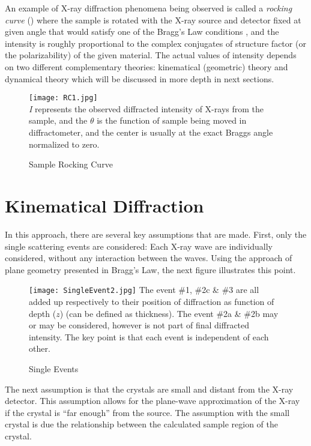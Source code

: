 An example of X-ray diffraction phenomena being observed is called a \emph{rocking curve} () where the sample is rotated with the X-ray source and detector fixed at given angle that would satisfy one of the Bragg's Law conditions , and the intensity is roughly proportional to the complex conjugates of structure factor (or the polarizability) of the given material.  The actual values of intensity depends on two different complementary theories:  kinematical (geometric) theory and dynamical theory which will be discussed in more depth in next sections.  

\begin{figure}[h]
\centering
\caption{Sample Rocking Curve}
\label{RC1}
\texttt{[image: RC1.jpg]}\\
\emph{I} represents the observed diffracted intensity of X-rays from the sample, and the $\theta$ is the function of sample being moved in diffractometer, and the center is usually at the exact Braggs angle normalized to zero.
\end{figure}




	\section{Kinematical Diffraction}

In this approach, there are several key assumptions that are made.  First, only the single scattering events are considered:  Each X-ray wave are individually considered, without any interaction between the waves.   Using the approach of plane geometry presented in Bragg's Law, the next figure  illustrates this point.  

\begin{figure}[h]
\caption{Single Events}
\label{SingleEvent}
\texttt{[image: SingleEvent2.jpg]}
The event \#1, \#2c \& \#3 are all added up respectively to their position of diffraction as function of depth ($z$) (can be defined as thickness).  The event \#2a \& \#2b may or may be considered, however is not part of final diffracted intensity.  The key point is that each event is independent of each other.
\end{figure}
 
The next assumption is that the crystals are small and distant from the X-ray detector.    This assumption allows for the plane-wave approximation of the X-ray if the crystal is ``far enough'' from the source.  The assumption with the small crystal is due the relationship between the calculated sample region of the crystal.  

